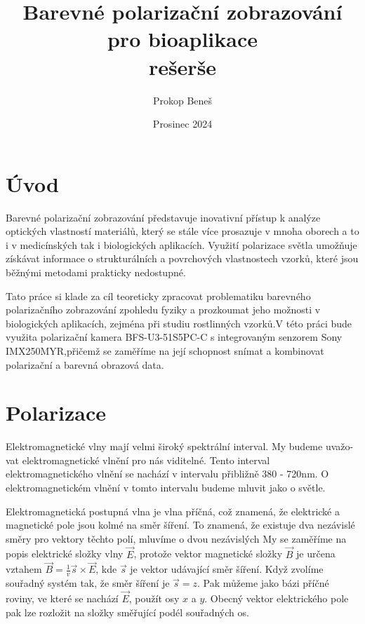 \documentclass[a4paper]{article}
\title{Barevné polarizační zobrazování pro bioaplikace \\rešerše}
\author{Prokop Beneš}
\date{Prosinec 2024}
\numberwithin{equation}{section}
\begin{document}
	\maketitle
	\newpage

	\tableofcontents
	\newpage

    \section{Úvod}
    Barevné polarizační zobrazování představuje inovativní přístup k analýze optických vlastností materiálů,
    který se stále více prosazuje v mnoha oborech a to i v medicínských tak i biologických aplikacích.\cite{biomedical,spie} Využití polarizace světla umožňuje získávat informace o strukturálních a povrchových vlastnostech vzorků, které jsou běžnými metodami prakticky nedostupné. \cite{photonics}
    \par Tato práce si klade za cíl teoreticky zpracovat problematiku barevného polarizačního zobrazování zpohledu fyziky a prozkoumat jeho možnosti v biologických aplikacích, zejména při studiu rostlinných vzorků.V této práci bude využita polarizační kamera BFS-U3-51S5PC-C s integrovaným senzorem Sony IMX250MYR,přičemž se zaměříme na její schopnost snímat a kombinovat polarizační a barevná obrazová data. \cite{flir,teledyne,senzor}
	\newpage
        
	\section{Polarizace}
    Elektromagnetické vlny mají velmi široký spektrální interval. My budeme uvažo-
    \\vat elektromagnetické vlnění pro nás viditelné. Tento interval elektromagnetického vlnění se nachází v intervalu přibližně 380 - 720nm. O elektromagnetickém vlnění v tomto intervalu budeme mluvit jako o světle. \cite{maly}
    \par Elektromagnetická postupná vlna je vlna příčná, což znamená, že elektrické a magnetické pole jsou kolmé na směr šíření. To znamená, že existuje dva nezávislé směry pro vektory těchto polí, mluvíme o dvou nezávislých My se zaměříme na popis elektrické složky vlny $\vec{E}$, protože vektor magnetické složky $\vec{B}$ je určena vztahem $\vec{B}= \frac{1}{v}\vec{s}\times\vec{E}$, kde $\vec{s}$ je vektor udávající směr šíření. Když zvolíme souřadný systém tak, že směr šíření je $\vec{s}=z$. Pak můžeme jako bázi příčné roviny, ve které se nachází $\vec{E}$, použít osy $x$ a $y$. Obecný vektor elektrického pole pak lze rozložit na složky směřující podél souřadných os.
\end{document}
